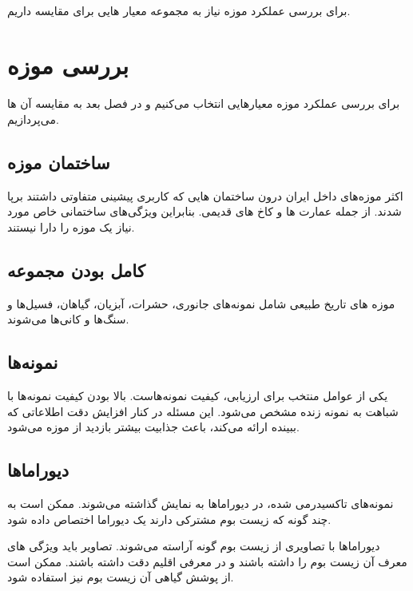 

\paragraph*{}
برای بررسی عملکرد موزه نیاز به مجموعه معیار هایی برای مقایسه داریم.


\section*{بررسی موزه}
برای بررسی عملکرد موزه معیارهایی انتخاب می‌کنیم و در فصل بعد به مقایسه آن ها می‌پردازیم.

\subsection*{ساختمان موزه}
اکثر موزه‌های داخل ایران درون ساختمان هایی که کاربری پیشینی متفاوتی داشتند برپا شدند. از جمله عمارت ها و کاخ های قدیمی.
بنابراین ویژگی‌های ساختمانی خاص مورد نیاز یک موزه را دارا نیستند.


\subsection*{کامل بودن مجموعه}
موزه های تاریخ طبیعی شامل نمونه‌های جانوری، حشرات، آبزیان، گیاهان، فسیل‌ها و سنگ‌ها و کانی‌ها می‌شوند.


\subsection*{نمونه‌ها}
یکی از عوامل منتخب برای ارزیابی، کیفیت نمونه‌هاست. بالا بودن کیفیت نمونه‌ها با شباهت به نمونه زنده مشخص می‌شود. این مسئله در کنار افزایش دقت اطلاعاتی که ببینده ارائه می‌کند، باعث جذابیت بیشتر بازدید از موزه می‌شود. 


\subsection*{دیوراماها}
نمونه‌های تاکسیدرمی شده، در دیوراماها به نمایش گذاشته می‌شوند. ممکن است به چند گونه که زیست بوم مشترکی دارند یک دیوراما اختصاص داده شود.

دیوراماها با تصاویری از زیست بوم گونه آراسته می‌شوند. تصاویر باید ویژگی های معرف آن زیست بوم را داشته باشند و در معرفی اقلیم دقت داشته باشند. ممکن است از پوشش گیاهی آن زیست بوم نیز استفاده شود.

